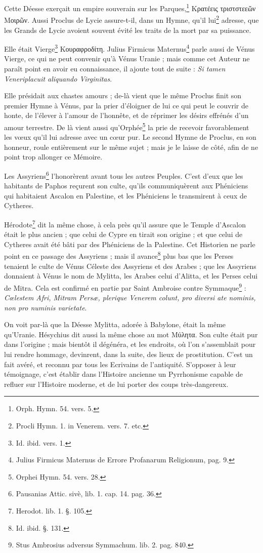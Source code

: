 \documentclass[a4paper, 11pt, oneside, polutonikogreek, french]{article}
\begin{document}
Cette Déesse exerçait un empire souverain sur les Parques,\footnote{Orph. Hymn. 54. vers. 5.} Κρατέεις τριστστεεῶν Μοιρῶν. Aussi Proclus de Lycie assure-t-il, dans un Hymne, qu'il lui\footnote{Procli Hymn. 1. in Venerem. vers. 7. etc.} adresse, que les Grands de Lycie avoient souvent évité les traits de la mort par sa puissance.

Elle était Vierge\footnote{Id. ibid. vers. 1.} Κουραφροδίτη. Julius Firmicus Maternus\footnote{Julius Firmicus Maternus de Errore Profanarum Religionum, pag. 9.} parle aussi de Vénus Vierge, ce qui ne peut convenir qu'à Vénus Uranie ; mais comme cet Auteur ne paraît point en avoir eu connaissance, il ajoute tout de suite : \emph{Si tamen Veneriplacuit aliquando Virginitas}.

Elle présidait aux chastes amours ; de-là vient que le même Proclus finit son premier Hymne à Vénus, par la prier d'éloigner de lui ce qui peut le couvrir de honte, de l'élever à l'amour de l'honnête, et de réprimer les désirs effrénés d'un amour terrestre. De là vient aussi qu'Orphée\footnote{Orphei Hymn. 54. vers. 28.} la prie de recevoir favorablement les vœux qu'il lui adresse avec un cœur pur. Le second Hymne de Proclus, en son honneur, roule entièrement sur le même sujet ; mais je le laisse de côté, afin de ne point trop allonger ce Mémoire.

Les Assyriens\footnote{Pausanias Attic. sivè, lib. 1. cap. 14. pag. 36.} l'honorèrent avant tous les autres Peuples. C'est d'eux que les habitants de Paphos reçurent son culte, qu'ils communiquèrent aux Phéniciens qui habitaient Ascalon en Palestine, et les Phéniciens le transmirent à ceux de Cytheres.

Hérodote\footnote{Herodot. lib. 1. §. 105.} dit la même chose, à cela près qu'il assure que le Temple d'Ascalon était le plus ancien ; que celui de Cypre en tirait son origine ; et que celui de Cytheres avait été bâti par des Phéniciens de la Palestine. Cet Historien ne parle point en ce passage des Assyriens ; mais il avance\footnote{Id. ibid. §. 131.} plus bas que les Perses tenaient le culte de Vénus Céleste des Assyriens et des Arabes ; que les Assyriens donnaient à Vénus le nom de Mylitta, les Arabes celui d'Alitta, et les Perses celui de Mitra. Cela est confirmé en partie par Saint Ambroise contre Symmaque\footnote{Stus Ambrosius adversus Symmachum. lib. 2. pag. 840.} : \emph{Cœlestem Afri, Mitram Persæ, plerique Venerem colunt, pro diversi ate nominis, non pro numinis varietate}.

On voit par-là que la Déesse Mylitta, adorée à Babylone, était la même qu'Uranie. Hésychius dit aussi la même chose au mot Μύλητα. Son culte était pur dans l'origine ; mais bientôt il dégénéra, et les endroits, où l'on s'assemblait pour lui rendre hommage, devinrent, dans la suite, des lieux de prostitution. C'est un fait avéré, et reconnu par tous les Ecrivains de l'antiquité. S'opposer à leur témoignage, c'est établir dans l'Histoire ancienne un Pyrrhonisme capable de refluer sur l'Histoire moderne, et de lui porter des coups très-dangereux.
\end{document}

